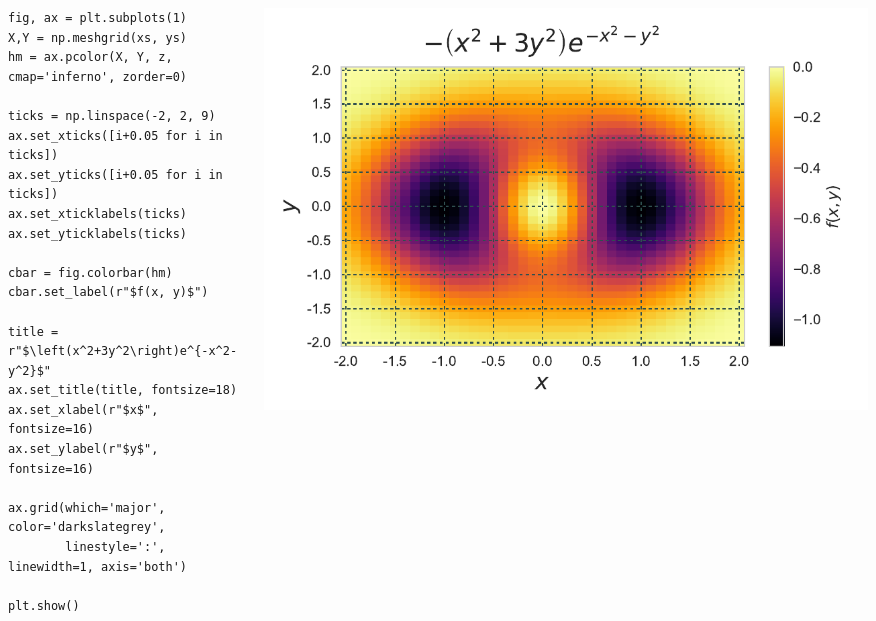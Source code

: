 \documentclass{beamer}
\begin{document}
\begin{frame}[fragile]
\tiny{
\begin{columns}
\begin{column}{0.45\textwidth}
\begin{verbatim}
fig, ax = plt.subplots(1)
X,Y = np.meshgrid(xs, ys)
hm = ax.pcolor(X, Y, z, cmap='inferno', zorder=0)

ticks = np.linspace(-2, 2, 9)
ax.set_xticks([i+0.05 for i in ticks])
ax.set_yticks([i+0.05 for i in ticks])
ax.set_xticklabels(ticks)
ax.set_yticklabels(ticks)

cbar = fig.colorbar(hm)
cbar.set_label(r"$f(x, y)$")

title = r"$\left(x^2+3y^2\right)e^{-x^2-y^2}$"
ax.set_title(title, fontsize=18)
ax.set_xlabel(r"$x$", fontsize=16)
ax.set_ylabel(r"$y$", fontsize=16)

ax.grid(which='major', color='darkslategrey',
        linestyle=':', linewidth=1, axis='both')

plt.show()
\end{verbatim}
\end{column}
\begin{column}{0.55\textwidth}
\includegraphics[width=\textwidth]{../heatmap_7.pdf}
\end{column}
\end{columns}
}
\end{frame}
\end{document}
